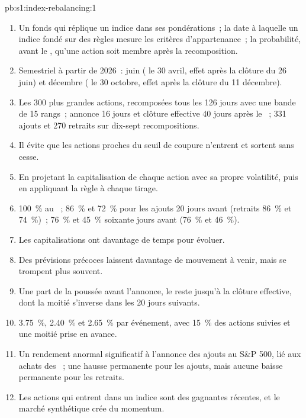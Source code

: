 \begin{solution}{pb:s1:index-rebalancing:1}
\begin{enumerate}
\item Un fonds qui réplique un indice dans ses pondérations~; la date à laquelle un indice fondé sur des règles mesure les critères d'appartenance~; la probabilité, avant le ,
qu'une action soit membre après la recomposition.
\item Semestriel à partir de 2026~: juin ( le 30 avril, effet après la clôture du 26 juin) et décembre ( le 30 octobre, effet après la clôture du
11 décembre).
\item Les 300 plus grandes actions, recomposées tous les 126 jours avec une bande de 15 rangs~; annonce 16 jours et clôture effective 40 jours après le ~;
331 ajouts et 270 retraits sur dix-sept recompositions.
\item Il évite que les actions proches du seuil de coupure n'entrent et sortent sans cesse.
\item En projetant la capitalisation de chaque action avec sa propre volatilité, puis en appliquant la règle à chaque tirage.
\item 100~\% au ~; 86~\% et 72~\% pour les ajouts 20 jours avant (retraits 86~\% et 74~\%)~; 76~\% et 45~\% soixante jours avant (76~\% et 46~\%).
\item Les capitalisations ont davantage de temps pour évoluer.
\item Des prévisions précoces laissent davantage de mouvement à venir, mais se trompent plus souvent.
\item Une part de la poussée avant l'annonce, le reste jusqu'à la clôture effective, dont la moitié s'inverse dans les 20 jours suivants.
\item 3.75~\%, 2.40~\% et 2.65~\% par événement, avec 15~\% des actions suivies et une moitié prise en avance.
\item Un rendement anormal significatif à l'annonce des ajouts au S\&P 500, lié aux achats des ~; une hausse permanente pour les ajouts, mais aucune
baisse permanente pour les retraits.
\item Les actions qui entrent dans un indice sont des gagnantes récentes, et le marché synthétique crée du momentum.

\end{enumerate}
\end{solution}
